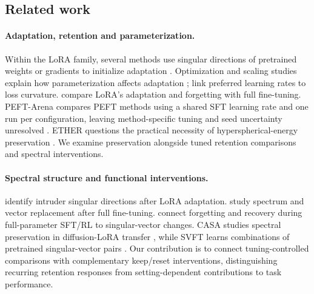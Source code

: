 \subsection{Related work}
\paragraph{Adaptation, retention and parameterization.}
Within the LoRA family, several methods use singular directions of pretrained weights or gradients to initialize adaptation \citep{meng2024pissa,wang2024loraga,zhang2025loraone,ponkshe2024lorasb}. 
Optimization and scaling studies explain how parameterization affects adaptation \citep{hayou2024loraplus,kalajdzievski2023rslora,wang2024loraga}; \citet{lee2026learningrate} link preferred learning rates to loss curvature. \citet{biderman2024loraforgetting} compare LoRA's adaptation and forgetting with full fine-tuning. PEFT-Arena compares PEFT methods using a shared SFT learning rate and one run per configuration, leaving method-specific tuning and seed uncertainty unresolved \citep{huang2026peftarena}. ETHER questions the practical necessity of hyperspherical-energy preservation \citep{bini2024ether}. We examine preservation alongside tuned retention comparisons and spectral interventions.

\paragraph{Spectral structure and functional interventions.}
\citet{shuttleworth2024illusion} identify intruder singular directions after LoRA adaptation. \citet{he2025posttrainingstructure} study spectrum and vector replacement after full fine-tuning. \citet{jin2026rlheals} connect forgetting and recovery during full-parameter SFT/RL to singular-vector changes. CASA studies spectral preservation in diffusion-LoRA transfer \citep{wang2026casa}, while SVFT learns combinations of pretrained singular-vector pairs \citep{lingam2024svft}. Our contribution is to connect tuning-controlled comparisons with complementary keep/reset interventions, distinguishing recurring retention responses from setting-dependent contributions to task performance.
